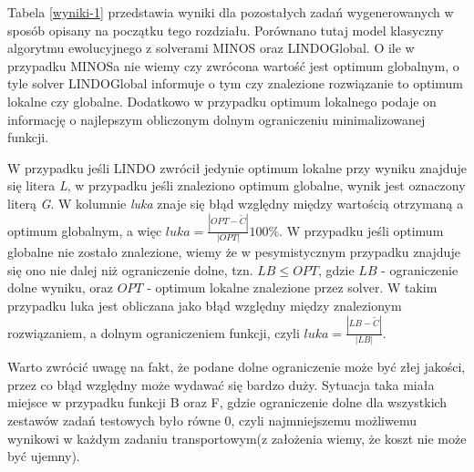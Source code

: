 Tabela \ref{wyniki-1} przedstawia wyniki dla pozostałych zadań wygenerowanych w sposób opisany na początku tego rozdziału. Porównano tutaj model klasyczny 
algorytmu ewolucyjnego z solverami MINOS oraz LINDOGlobal. O ile w przypadku MINOSa nie wiemy czy zwrócona wartość jest optimum globalnym, o tyle 
solver LINDOGlobal informuje o tym czy znalezione rozwiązanie to optimum lokalne czy globalne. Dodatkowo w przypadku optimum lokalnego podaje on 
informację o najlepszym obliczonym dolnym ograniczeniu minimalizowanej funkcji. 

W przypadku jeśli LINDO zwrócił jedynie optimum lokalne przy wyniku znajduje się litera \textit{L}, w przypadku jeśli znaleziono optimum globalne, 
wynik jest oznaczony literą \textit{G}. W kolumnie \textit{luka} znaje się błąd względny między wartością otrzymaną a optimum globalnym, 
a więc $luka = \frac{|OPT - \tilde{C}|}{|OPT|} 100 \%$. W przypadku jeśli optimum globalne nie zostało znalezione, wiemy że w pesymistycznym 
przypadku znajduje się ono nie dalej niż ograniczenie dolne, tzn. $LB \le OPT$, gdzie $LB$ - ograniczenie dolne wyniku, oraz $OPT$ - optimum 
lokalne znalezione przez solver. W takim przypadku luka jest obliczana jako błąd względny między znalezionym rozwiązaniem, a dolnym ograniczeniem 
funkcji, czyli $luka = \frac{|LB - \tilde{C}|}{|LB|}$. 

Warto zwrócić uwagę na fakt, że podane dolne ograniczenie może być złej jakości, przez co błąd względny może wydawać się bardzo duży. Sytuacja 
taka miała miejsce w przypadku funkcji B oraz F, gdzie ograniczenie dolne dla wszystkich zestawów zadań testowych było równe $0$, czyli najmniejszemu 
możliwemu wynikowi w każdym zadaniu transportowym(z założenia wiemy, że koszt nie może być ujemny).

\newpage

